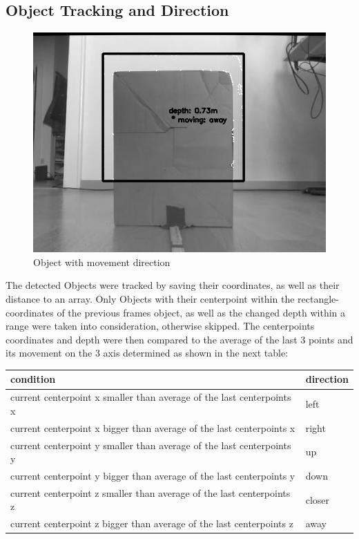 \documentclass[journal,onecolumn]{IEEEtran}
\begin{document}
\subsection{Object Tracking and Direction}
\begin{figure}[H]
	\centering
	\includegraphics[scale=0.5]{box_direction.png}
	\captionsetup{justification=centering}
	\caption{Object with movement direction}
\end{figure}
\noindent The detected Objects were tracked by saving their coordinates, as well as their distance to an array. Only Objects with their centerpoint within the rectangle-coordinates of the previous frames object, as well as the changed depth within a range were taken into consideration, otherwise skipped. The centerpoints coordinates and depth were then compared to the average of the last 3 points and its movement on the 3 axis determined as shown in the next table:
\begin{table}[H]
	\begin{tabular}{|l|l|}
		\hline
		condition & direction \\ \hline
		 current centerpoint x smaller than average of the last centerpoints x             & left               \\ \hline
		 current centerpoint x bigger than average of the last centerpoints x              & right               \\ \hline
		 current centerpoint y smaller than average of the last centerpoints y             & up               \\ \hline
		 current centerpoint y bigger than average of the last centerpoints y             & down             \\ \hline
		 current centerpoint z smaller than average of the last centerpoints z             & closer             \\ \hline
		 current centerpoint z bigger than average of the last centerpoints z              & away              \\ \hline
	\end{tabular}
\end{table}
\end{document}
